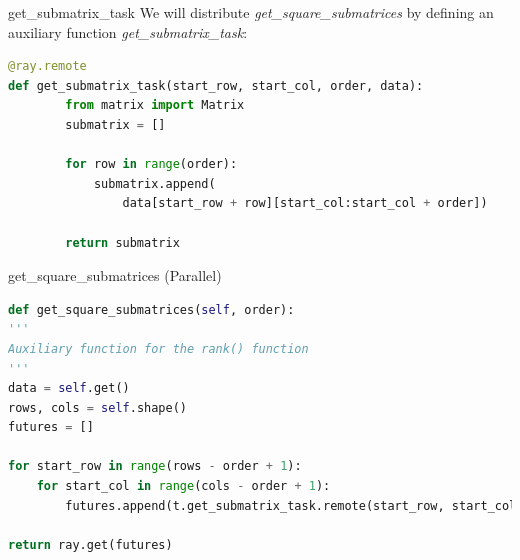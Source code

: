 \documentclass{beamer}
\begin{document}
\begin{frame}[fragile]{{get\_submatrix\_task}}
    We will distribute \textit{get\_square\_submatrices} by defining an auxiliary function \textit{get\_submatrix\_task}:
    
    \begin{lstlisting}[language=Python]
@ray.remote
def get_submatrix_task(start_row, start_col, order, data):
        from matrix import Matrix
        submatrix = []

        for row in range(order):
            submatrix.append(
                data[start_row + row][start_col:start_col + order])
            
        return submatrix
        \end{lstlisting}
\end{frame}
\begin{frame}[fragile]{get\_square\_submatrices (Parallel)}
    \begin{lstlisting}[language=Python]
def get_square_submatrices(self, order):
'''
Auxiliary function for the rank() function
'''
data = self.get()
rows, cols = self.shape()
futures = []

for start_row in range(rows - order + 1):
    for start_col in range(cols - order + 1):            
        futures.append(t.get_submatrix_task.remote(start_row, start_col, order, data))

return ray.get(futures) 
        \end{lstlisting}
\end{frame}
\end{document}

